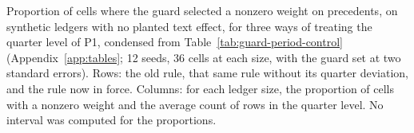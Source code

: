 \begin{table}[t]\centering\scriptsize
\caption{Proportion of cells where the guard selected a nonzero weight on precedents, on synthetic ledgers with no planted text effect, for three ways of treating the quarter level of P1, condensed from Table~\ref{tab:guard-period-control} (Appendix~\ref{app:tables}; 12 seeds, 36 cells at each size, with the guard set at two standard errors). Rows: the old rule, that same rule without its quarter deviation, and the rule now in force. Columns: for each ledger size, the proportion of cells with a nonzero weight and the average count of rows in the quarter level. No interval was computed for the proportions.}
\label{tab:fmt-period-rule}

\end{table}

